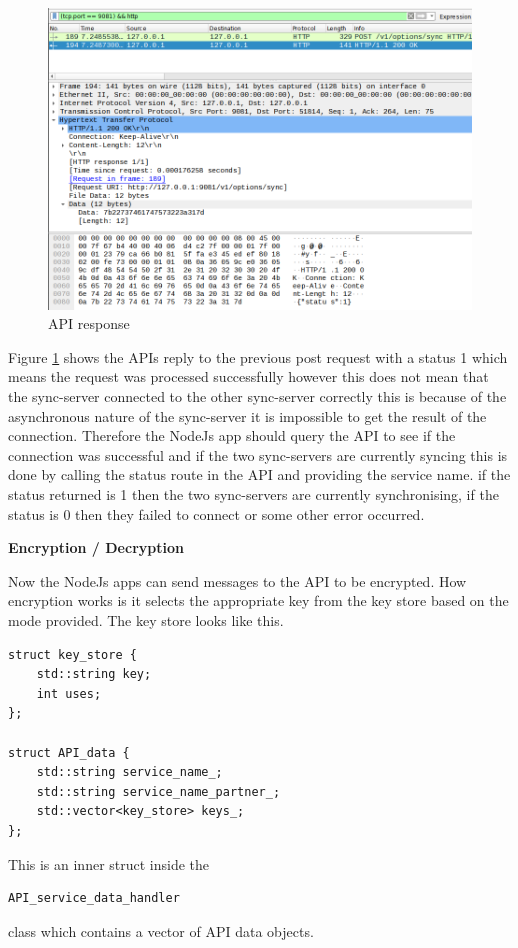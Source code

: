 \begin{figure}[!h]
  \centering
      \includegraphics[width=1\textwidth]{Figures/b10.png}
  \caption[API response]{API response}
  \label{fig:b10}
\end{figure}
\FloatBarrier
Figure \ref{fig:b10} shows the APIs reply to the previous post request with a status 1 which means the request was processed successfully however this does not mean that the sync-server connected to the other sync-server correctly this is because of the asynchronous nature of the sync-server it is impossible to get the result of the connection. Therefore the NodeJs app should query the API to see if the connection was successful and if the two sync-servers are currently syncing this is done by calling the status route in the API and providing the service name. if the status returned is 1 then the two sync-servers are currently synchronising, if the status is 0 then they failed to connect or some other error occurred.

\textbf{Encryption / Decryption}

Now the NodeJs apps can send messages to the API to be encrypted.
How encryption works is it selects the appropriate key from the key store based on the mode provided.
The key store looks like this.
\begin{lstlisting}
struct key_store {
    std::string key;
    int uses;
};

struct API_data {
    std::string service_name_;
    std::string service_name_partner_;
    std::vector<key_store> keys_;
};
\end{lstlisting} 
This is an inner struct inside the 
\begin{lstlisting}
API_service_data_handler
\end{lstlisting} 
class which contains a vector of API data objects.

